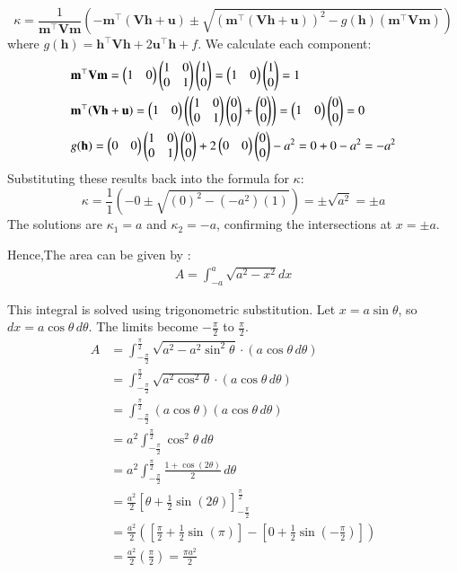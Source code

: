 \documentclass[article]{IEEEtran}
\begin{document}
\[
\kappa = \frac{1}{\mathbf{m}^\top\mathbf{V}\mathbf{m}} \left( -\mathbf{m}^\top(\mathbf{V}\mathbf{h} + \mathbf{u}) \pm \sqrt{ (\mathbf{m}^\top(\mathbf{V}\mathbf{h} + \mathbf{u}))^2 - g(\mathbf{h})(\mathbf{m}^\top\mathbf{V}\mathbf{m}) } \right)
\]
where $g(\mathbf{h}) = \mathbf{h}^\top\mathbf{V}\mathbf{h} + 2\mathbf{u}^\top\mathbf{h} + f$. We calculate each component:
\begin{align}
&\mathbf{m}^\top\mathbf{V}\mathbf{m} = \begin{pmatrix}1 & 0\end{pmatrix} \begin{pmatrix}1 & 0 \\ 0 & 1\end{pmatrix} \begin{pmatrix}1 \\ 0\end{pmatrix} = \begin{pmatrix}1 & 0\end{pmatrix} \begin{pmatrix}1 \\ 0\end{pmatrix} = 1\\
	&\mathbf{m}^\top(\mathbf{V}\mathbf{h} + \mathbf{u}) = \begin{pmatrix}1 & 0\end{pmatrix} \left( \begin{pmatrix}1 & 0 \\ 0 & 1\end{pmatrix} \begin{pmatrix}0 \\ 0\end{pmatrix} + \begin{pmatrix}0 \\ 0\end{pmatrix} \right) = \begin{pmatrix}1 & 0\end{pmatrix} \begin{pmatrix}0 \\ 0\end{pmatrix} = 0\\
	&g(\mathbf{h}) = \begin{pmatrix}0 & 0\end{pmatrix}\begin{pmatrix}1 & 0 \\ 0 & 1\end{pmatrix}\begin{pmatrix}0 \\ 0\end{pmatrix} + 2\begin{pmatrix}0 & 0\end{pmatrix}\begin{pmatrix}0 \\ 0\end{pmatrix} - a^2 = 0 + 0 - a^2 = -a^2
\end{align}
Substituting these results back into the formula for $\kappa$:
\[
\kappa = \frac{1}{1} \left( -0 \pm \sqrt{ (0)^2 - (-a^2)(1) } \right) = \pm \sqrt{a^2} = \pm a
\]
The solutions are $\kappa_1 = a$ and $\kappa_2 = -a$, confirming the intersections at $x=\pm a$.

Hence,The area can be given by :
\begin{align}
A = \int_{-a}^{a} \sqrt{a^2 - x^2} dx
\end{align}


This integral is solved using trigonometric substitution. Let $x = a \sin\theta$, so $dx = a \cos\theta \,d\theta$. The limits become $-\frac{\pi}{2}$ to $\frac{\pi}{2}$.
\begin{align}
	A &= \int_{-\frac{\pi}{2}}^{\frac{\pi}{2}} \sqrt{a^2 - a^2\sin^2\theta} \cdot (a \cos\theta \,d\theta) \\
	&= \int_{-\frac{\pi}{2}}^{\frac{\pi}{2}} \sqrt{a^2\cos^2\theta} \cdot (a \cos\theta \,d\theta) \\
	&= \int_{-\frac{\pi}{2}}^{\frac{\pi}{2}} (a \cos\theta) (a \cos\theta \,d\theta) \\
	&= a^2 \int_{-\frac{\pi}{2}}^{\frac{\pi}{2}} \cos^2\theta \,d\theta \\
	&= a^2 \int_{-\frac{\pi}{2}}^{\frac{\pi}{2}} \frac{1 + \cos(2\theta)}{2} \,d\theta \\
	&= \frac{a^2}{2} \left[ \theta + \frac{1}{2}\sin(2\theta) \right]_{-\frac{\pi}{2}}^{\frac{\pi}{2}} \\
	&= \frac{a^2}{2} \left( \left[ \frac{\pi}{2} + \frac{1}{2}\sin(\pi) \right] - \left[ 0 + \frac{1}{2}\sin(-\frac{\pi}{2}) \right] \right) \\
	&= \frac{a^2}{2} \left( \frac{\pi}{2} \right) = \frac{\pi a^2}{2}
\end{align}
\end{document}
